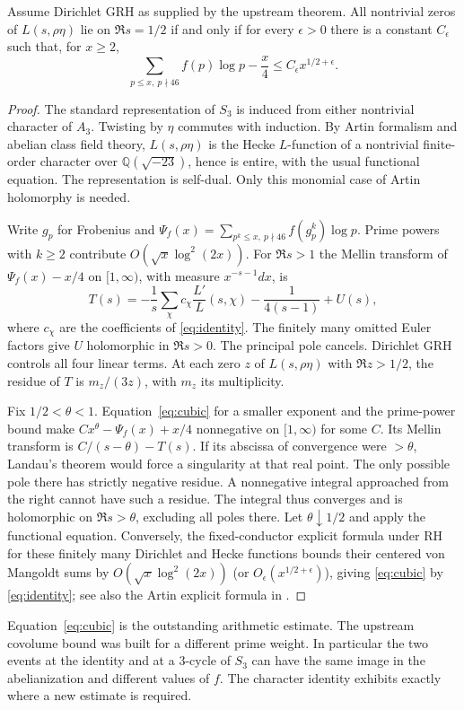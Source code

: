 \begin{theorem}\label{th:cubic}
Assume Dirichlet GRH as supplied by the upstream theorem. All nontrivial zeros of $L(s,\rho\eta)$ lie on $\Re s=1/2$ if and only if for every $\epsilon>0$ there is a constant $C_\epsilon$ such that, for $x\ge2$,
\begin{equation}\label{eq:cubic}
       \sum_{p\le x,\ p\nmid46} f(p)\log p-\frac{x}{4}
                   \le C_\epsilon x^{1/2+\epsilon}.
\end{equation}
\end{theorem}
\begin{proof}
The standard representation of $S_3$ is induced from either nontrivial character of $A_3$. Twisting by $\eta$ commutes with induction. By Artin formalism and abelian class field theory, $L(s,\rho\eta)$ is the Hecke $L$-function of a nontrivial finite-order character over $\mathbb Q(\sqrt{-23})$, hence is entire, with the usual functional equation. The representation is self-dual. Only this monomial case of Artin holomorphy is needed.

Write $g_p$ for Frobenius and $\Psi_f(x)=\sum_{p^k\le x,\ p\nmid46} f(g_p^k)\log p$. Prime powers with $k\ge2$ contribute $O(\sqrt x\log^2(2x))$. For $\Re s>1$ the Mellin transform of $\Psi_f(x)-x/4$ on $[1,\infty)$, with measure $x^{-s-1}dx$, is
\[
 T(s)=-\frac1s\sum_\chi c_\chi\frac{L'}{L}(s,\chi)
                     -\frac1{4(s-1)}+U(s),
\]
where $c_\chi$ are the coefficients of \eqref{eq:identity}. The finitely many omitted Euler factors give $U$ holomorphic in $\Re s>0$. The principal pole cancels. Dirichlet GRH controls all four linear terms. At each zero $z$ of $L(s,\rho\eta)$ with $\Re z>1/2$, the residue of $T$ is $m_z/(3z)$, with $m_z$ its multiplicity.

Fix $1/2<\theta<1$. Equation~\eqref{eq:cubic} for a smaller exponent and the prime-power bound make $Cx^\theta-\Psi_f(x)+x/4$ nonnegative on $[1,\infty)$ for some $C$. Its Mellin transform is $C/(s-\theta)-T(s)$. If its abscissa of convergence were $>\theta$, Landau's theorem would force a singularity at that real point. The only possible pole there has strictly negative residue. A nonnegative integral approached from the right cannot have such a residue. The integral thus converges and is holomorphic on $\Re s>\theta$, excluding all poles there. Let $\theta\downarrow1/2$ and apply the functional equation. Conversely, the fixed-conductor explicit formula under RH for these finitely many Dirichlet and Hecke functions bounds their centered von Mangoldt sums by $O(\sqrt x\log^2(2x))$ (or $O_\epsilon(x^{1/2+\epsilon})$), giving \eqref{eq:cubic} by \eqref{eq:identity}; see also the Artin explicit formula in \cite{ng}.
\end{proof}
Equation~\eqref{eq:cubic} is the outstanding arithmetic estimate. The upstream covolume bound was built for a different prime weight. In particular the two events at the identity and at a 3-cycle of $S_3$ can have the same image in the abelianization and different values of $f$. The character identity exhibits exactly where a new estimate is required.
